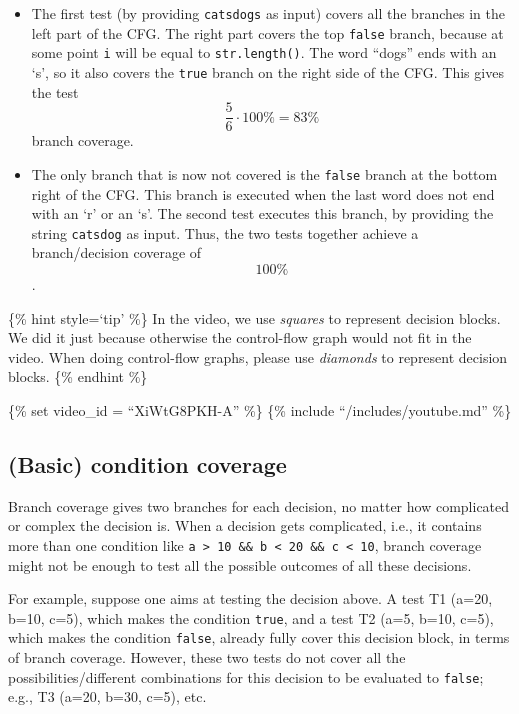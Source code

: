 \begin{itemize}
\item
  The first test (by providing \texttt{cats\textbar{}dogs} as input)
  covers all the branches in the left part of the CFG. The right part
  covers the top \texttt{false} branch, because at some point \texttt{i}
  will be equal to \texttt{str.length()}. The word ``dogs'' ends with an
  `s', so it also covers the \texttt{true} branch on the right side of
  the CFG. This gives the test \[\frac{5}{6} \cdot 100\% = 83\%\] branch
  coverage.
\item
  The only branch that is now not covered is the \texttt{false} branch
  at the bottom right of the CFG. This branch is executed when the last
  word does not end with an `r' or an `s'. The second test executes this
  branch, by providing the string \texttt{cats\textbar{}dog} as input.
  Thus, the two tests together achieve a branch/decision coverage of
  \[100\%\].
\end{itemize}

\{\% hint style=`tip' \%\} In the video, we use \emph{squares} to
represent decision blocks. We did it just because otherwise the
control-flow graph would not fit in the video. When doing control-flow
graphs, please use \emph{diamonds} to represent decision blocks. \{\%
endhint \%\}

\{\% set video\_id = ``XiWtG8PKH-A'' \%\} \{\% include
``/includes/youtube.md'' \%\}

\hypertarget{basic-condition-coverage}{%
\subsection{(Basic) condition coverage}\label{basic-condition-coverage}}

Branch coverage gives two branches for each decision, no matter how
complicated or complex the decision is. When a decision gets
complicated, i.e., it contains more than one condition like
\texttt{a\ \textgreater{}\ 10\ \&\&\ b\ \textless{}\ 20\ \&\&\ c\ \textless{}\ 10},
branch coverage might not be enough to test all the possible outcomes of
all these decisions.

For example, suppose one aims at testing the decision above. A test T1
(a=20, b=10, c=5), which makes the condition \texttt{true}, and a test
T2 (a=5, b=10, c=5), which makes the condition \texttt{false}, already
fully cover this decision block, in terms of branch coverage. However,
these two tests do not cover all the possibilities/different
combinations for this decision to be evaluated to \texttt{false}; e.g.,
T3 (a=20, b=30, c=5), etc.

